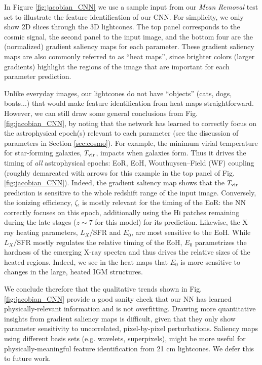 \documentclass[fleqn,usenatbib]{mnras}
\begin{document}
In Figure \ref{fig:jacobian_CNN} we use a sample input from our \textit{Mean Removal} test set to illustrate the feature identification of our CNN.  For simplicity, we only show 2D slices through the 3D lightcones.  The top panel corresponds to the cosmic signal, the second panel to the input image, and the bottom four are the (normalized) gradient saliency maps for each parameter.  These gradient saliency maps are also commonly referred to as \enquote{heat maps}, since brighter colors (larger gradients) highlight the regions of the image that are important for each parameter prediction.

Unlike everyday images, our lightcones do not have \enquote{objects} (cats, dogs, boats...) that would make feature identification from heat maps straightforward.  However, we can still draw some general conclusions from Fig. \ref{fig:jacobian_CNN}, by noting that the network has learned to correctly focus on the astrophysical epoch(s) relevant to each parameter (see the discussion of parameters in Section \ref{sec:cosmo}).  For example, the minimum virial temperature for star-forming galaxies, $T_{\rm vir}$, impacts when galaxies form.  Thus it drives the timing of {\it all} astrophysical epochs: EoR, EoH, Wouthuysen–Field (WF) coupling (roughly demarcated with arrows for this example in the top panel of Fig. \ref{fig:jacobian_CNN}).  Indeed, the gradient saliency map shows that the $T_{\rm vir}$ prediction is sensitive to the whole redshift range of the input image.  Conversely, the ionizing efficiency, $\zeta$, is mostly relevant for the timing of the EoR: the NN correctly focuses on this epoch, additionally using the \textsc{Hi} patches remaining during the late stages ($z\sim7$ for this model) for its prediction.  Likewise, the X-ray heating parameters, $L_X/$SFR and $E_0$, are most sensitive to the EoH.  While $L_X/$SFR mostly regulates the relative timing of the EoH, $E_0$ parametrizes the hardness of the emerging X-ray spectra and thus drives the relative sizes of the heated regions.  Indeed, we see in the heat maps that $E_0$ is more sensitive to changes in the large, heated IGM structures.

We conclude therefore that the qualitative trends shown in Fig. \ref{fig:jacobian_CNN} provide a good sanity check that our NN has learned physically-relevant information and is not overfitting. Drawing more quantitative insights from gradient saliency maps is difficult, given that they only show parameter sensitivity to uncorrelated, pixel-by-pixel perturbations.  Saliency maps using different basis sets (e.g. wavelets, superpixels), might be more useful for physically-meaningful feature identification from 21 cm lightcones. We defer this to future work.
\end{document}
